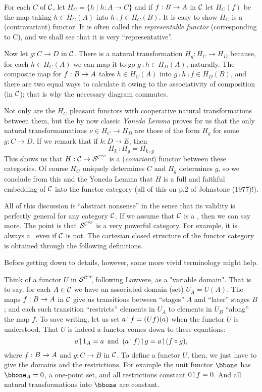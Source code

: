 For each $C$ of $\mathcal C$, let $H_C = \{ h \mid h: A \to C \}$ and if $f: B \rightarrow A$ in $\mathcal C$ let $H_C(f)$ be the map taking $h \in H_C(A)$ into $h \comp f \in H_C(B)$.
It is easy to show $H_C$ is a (contravariant) functor. It is often called the {\it representable functor} (corresponding to C), and we shall see that it is very ``representative''.

Now let $g: C \to D$ in $\mathcal C$. There is a natural transformation
$H_g: H_C \to H_D$ because, for each $h \in H_C(A)$ we can map it to go $g \comp h \in H_D(A)$, naturally. The composite map for $f : B \rightarrow A$
takes $h \in H_C(A)$ into $g \comp h \comp f \in H_D(B)$, and there are two equal
ways to calculate it owing to the associativity of composition (in $\mathcal C$); that is why the necessary diagram commutes.

Not only are the $H_C$ pleasant functors with cooperative natural transformations between them, but the by now classic {\it Yoneda Lemma}
proves for us that the only natural transformamations $\nu \in H_C \to H_D$
are those of the form $H_g$ for some $g: C\to D$. If we remark that if $k:D\to E$, then
$$
H_k \comp H_g = H_{k \comp g}
$$
%
This shows us that $H : \mathcal C \rightarrow \mathcal S^{\mathcal C^{op}}$ is a ({\it covariant}) functor between these categories.
Of course $H_C$ uniquely determines $C$ and
$H_g$ determines $g$, so we conclude from this and the Yoneda Lemma that $H$ is a full and faithful embedding of $\mathcal C$ into the functor
category (all of this on p.2 of Johnstone (1977)!).

All of this discussion is ``abstract nonsense'' in the sense that its validity is perfectly general for any category $\mathcal C$. If we assume that $\mathcal C$ is a \ccc, then we can say more. The point is that $\mathcal S^{\mathcal C^{op}}$ is a very powerful category. For example, it is
always a \ccc\  even if $\mathcal C$ is not. The cartesian closed structure of the functor category is obtained through the following definitions.

Before getting down to details, however, some more vivid terminology might help.

Think of a functor $U$ in $\mathcal S^{\mathcal C^{op}}\!\!$, following Lawvere, as a "variable domain".  That is to say, for each $A \in \mathcal C$ we have an associated domain (set) $U_A = U(A)$. The maps $f:B \rightarrow A$ in $\mathcal C$ give us transitions between ``stages'' $A$ and ``later'' stages $B$; and each such transition ``restricts'' elements in
$U_A$ to elements in $U_B$ ``along'' the map $f$. To save writing, let us set $a \!\upharpoonleft\! f = (Uf)(a)$ when the functor $U$ is understood. That $U$ is indeed a functor comes down to these equations:
$$
a \res \id_A = a \,\textrm{ and }\, (a \res f) \res g = a \res (f \comp g),
$$
where  $f : B \rightarrow A$ and $g: C\to B$ in $\mathcal C$. To define a functor $U$, then, we just have to give the domains and the restrictions.
For example the unit functor $\bbone$ has $\bbone_A = {0}$, a one-point set, and all restrictions constant $0 \!\upharpoonleft\! f = 0$. And all natural transformations into $\bbone$ are constant.

